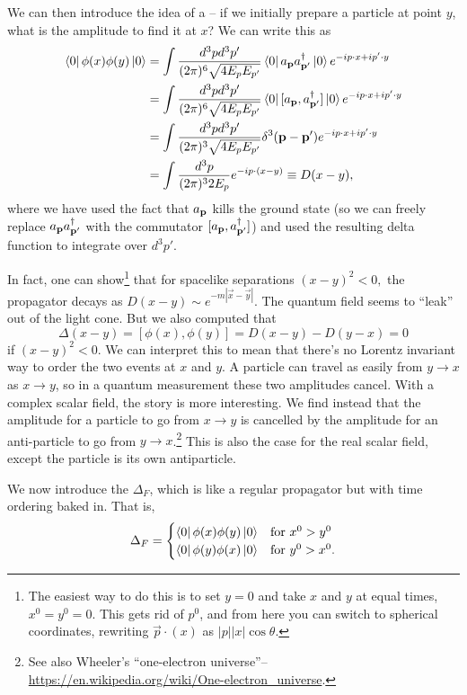 \begin{defn}
We can then introduce the idea of a -- if we initially prepare a particle at point $y$, what is the amplitude to find it at $x$? We can write this as
%
\begin{align*}
    \left< 0 \right|\phi(x) \phi(y)\left| 0 \right>&=\int \frac{d^3p d^3 p'}{(2\pi)^6 \sqrt{4 E_p E_{p'}}} \left< 0 \right| a_{\boldsymbol{\mathbf{p}}} a_{\boldsymbol{\mathbf{p}}'}^\dagger \left| 0 \right> e^{-ip \cdot x +i p'\cdot y}\\
    &=\int \frac{d^3p d^3 p'}{(2\pi)^6\sqrt{4 E_p E_{p'}}} \left< 0 \right| [a_{\boldsymbol{\mathbf{p}}}, a_{\boldsymbol{\mathbf{p}}'}^\dagger] \left| 0 \right>e^{-ip \cdot x +i p'\cdot y}\\
    &=\int \frac{d^3p d^3 p'}{(2\pi)^3\sqrt{4 E_p E_{p'}}} \delta^3 (\boldsymbol{\mathbf{p}}- \boldsymbol{\mathbf{p}}') e^{-ip \cdot x +i p'\cdot y}\\
    &=\int \frac{d^3p}{(2\pi)^3 2 E_p}e^{-ip\cdot (x-y)} \equiv D(x-y),
\end{align*}
%
where we have used the fact that $a_{\boldsymbol{\mathbf{p}}}$ kills the ground state (so we can freely replace $a_{\boldsymbol{\mathbf{p}}} a_{\boldsymbol{\mathbf{p}}'}^\dagger$ with the commutator $[a_{\boldsymbol{\mathbf{p}}},a_{\boldsymbol{\mathbf{p}}'}^\dagger]$) and used the resulting delta function to integrate over $d^3p'$.
\end{defn}

In fact, one can show\footnote{The easiest way to do this is to set $y=0$ and take $x$ and $y$ at equal times, $x^0=y^0=0$. This gets rid of $p^0$, and from here you can switch to spherical coordinates, rewriting $\vec p \cdot (x)$ as $|p||x|\cos\theta$.} that for spacelike separations $(x-y)^2<0,$ the propagator decays as $D(x-y)\sim e^{-m|\vec x-\vec y|}.$ The quantum field seems to ``leak'' out of the light cone. But we also computed that
$$\Delta(x-y)=[\phi(x),\phi(y)] =D(x-y)-D(y-x)=0$$ if $(x-y)^2<0$. We can interpret this to mean that there's no Lorentz invariant way to order the two events at $x$ and $y$. A particle can travel as easily from $y\to x$ as $x\to y$, so in a quantum measurement these two amplitudes cancel. With a complex scalar field, the story is more interesting. We find instead that the amplitude for a particle to go from $x\to y$ is cancelled by the amplitude for an anti-particle to go from $y\to x$.\footnote{See also Wheeler's ``one-electron universe''-- \url{https://en.wikipedia.org/wiki/One-electron_universe}.} This is also the case for the real scalar field, except the particle is its own antiparticle.

\begin{defn}
We now introduce the  $\Delta_F$, which is like a regular propagator but with time ordering baked in. That is,
$$\Delta_F =\begin{cases}
  \left< 0 \right|\phi(x)\phi(y)\left| 0 \right> & \text{for } x^0 > y^0\\    
  \left< 0 \right|\phi(y)\phi(x)\left| 0 \right> & \text{for } y^0 > x^0.
\end{cases}$$
\end{defn}


